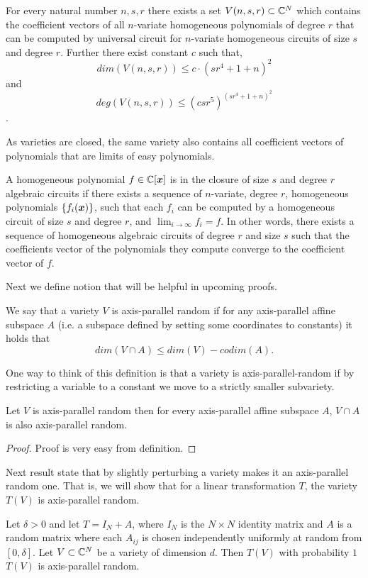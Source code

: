{\begin{corollary}
For every natural number $n,s,r$ there exists a set $V(n,s,r)\subset\mathbb{C}^N$ which contains the coefficient vectors of all $n$-variate homogeneous polynomials of degree $r$ that can be computed by universal circuit for $n$-variate homogeneous circuits of size $s$ and degree $r$. Further there exist constant $c$ such that, $$dim(V(n,s,r))\le c\cdot(sr^4+1+n)^2$$ and $$deg(V(n,s,r))\le(csr^5)^{(sr^4+1+n)^2}$$.
\end{corollary}

As varieties are closed, the same variety also contains all coefficient vectors of polynomials that are limits of easy polynomials.

\begin{definition}
A homogeneous polynomial $f\in\mathbb{C}[\bm x]$ is in the closure of size $s$ and degree $r$ algebraic circuits if there exists a sequence of $n$-variate, degree $r$, homogeneous polynomials $\{f_i(\bm x)\}$, such that each $f_i$ can be computed by a homogeneous circuit of size $s$ and degree $r$, and
$\lim_{i\to\infty} f_i=f$. In other words, there exists a sequence of homogeneous algebraic circuits of degree $r$ and size $s$ such that the coefficients vector of the polynomials they compute converge to the coefficient vector of $f$.
\end{definition}

Next we define notion that will be helpful in upcoming proofs.
\begin{definition}
We say that a variety $V$ is axis-parallel random if for any axis-parallel affine subspace $A$ (i.e. a subspace defined by setting some coordinates to constants) it holds that $$dim(V\cap A)\le dim(V)-codim(A).$$
\end{definition}

One way to think of this definition is that a variety is axis-parallel-random if by restricting a variable to a constant we move to a strictly smaller subvariety.

\begin{lemma} 
Let $V$ is axis-parallel random then for every axis-parallel affine subspace $A$, $V\cap A$ is also axis-parallel random.
\end{lemma}
\thmpara
\begin{proof}
Proof is very easy from definition.
\end{proof}
\npara
Next result state that by slightly perturbing a variety makes it an axis-parallel random one. That is, we will show that for a linear transformation $T$, the variety $T(V)$ is axis-parallel random.

\begin{theorem}
Let $\delta>0$ and let $T=I_N+A$, where $I_N$ is the $N\times N$ identity matrix and $A$ is a random matrix where each $A_{ij}$ is chosen
independently uniformly at random from $[0,\delta]$. Let $V\subset \mathbb{C}^N$ be a variety of dimension $d$. Then $T(V)$ with probability $1$ $T(V)$ is axis-parallel random.
\end{theorem}
}